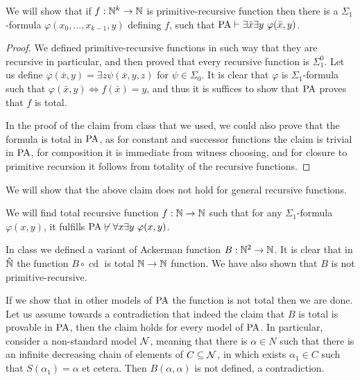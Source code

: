 \question{}
\subquestion{}
We will show that if $f : \mathbb{N}^k \to \mathbb{N}$ is primitive-recursive function then there is a $\Sigma_1$-formula $\varphi(x_0, \ldots, x_{k - 1}, y)$ defining $f$,
such that $\operatorname{PA} \vdash \exists \bar{x} \exists y\ \varphi(\bar{x}, y)$.
\begin{proof}
	We defined primitive-recursive functions in such way that they are recursive in particular, and then proved that every recursive function is $\Sigma_1^0$.
	Let us define $\varphi(\bar{x}, y) = \exists z \psi(\bar{x}, y, z)$ for $\psi \in \Sigma_0$.
	It is clear that $\varphi$ is $\Sigma_1$-formula such that $\varphi(\bar{x}, y) \iff f(\bar{x}) = y$, and thus it is suffices to show that $\operatorname{PA}$ proves that $f$ is total.

	In the proof of the claim from class that we used, we could also prove that the formula is total in $\operatorname{PA}$,
	as for constant and successor functions the claim is trivial in $\operatorname{PA}$, for composition it is immediate from witness choosing, and for closure to primitive recursion it follows from totality of the recursive functions.
\end{proof}

\subquestion{}
We will show that the above claim does not hold for general recursive functions.
\begin{solution}
	We will find total recursive function $f : \mathbb{N} \to \mathbb{N}$ such that for any $\Sigma_1$-formula $\varphi(x, y)$, it fulfills $\operatorname{PA} \not\vdash \forall x \exists y\ \varphi(x, y)$.

	In class we defined a variant of Ackerman function $B : \mathbb{N}^2 \to \mathbb{N}$.
	It is clear that in $\hat{\mathbb{N}}$ the function $B \circ \operatorname{cd}$ is total $\mathbb{N} \to \mathbb{N}$ function.
	We have also shown that $B$ is not primitive-recursive.

	If we show that in other models of $\operatorname{PA}$ the function is not total then we are done.
	Let us assume towards a contradiction that indeed the claim that $B$ is total is provable in $\operatorname{PA}$, then the claim holds for every model of $\operatorname{PA}$.
	In particular, consider a non-standard model $\mathcal{N}$, meaning that there is $\alpha \in N$ such that there is an infinite decreasing chain of elements of $C \subseteq \mathcal{N}$,
	in which exists $\alpha_1 \in C$ such that $S(\alpha_1) = \alpha$ et cetera.
	Then $B(\alpha, \alpha)$ is not defined, a contradiction.
\end{solution}

